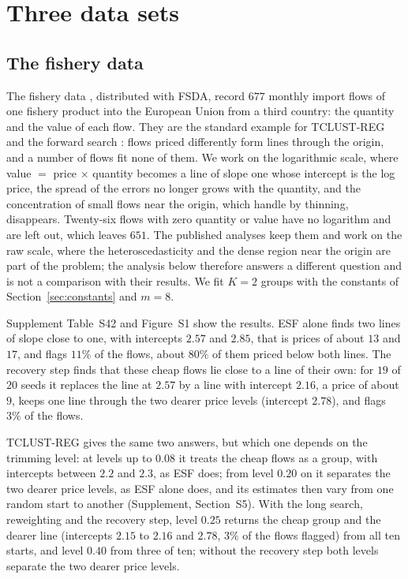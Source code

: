 \section{Three data sets}
\label{sec:realdata}

\subsection{The fishery data}
\label{sec:fishery}

The fishery data \citep{riani2008fitting}, distributed with FSDA, record $677$ monthly import
flows of one fishery product into the European Union from a third country: the quantity and
the value of each flow. They are the standard example for TCLUST-REG and the forward search
\citep{perrotta2009new,cerioli2014robust}: flows priced differently form lines through the
origin, and a number of flows fit none of them. We work on the logarithmic scale, where value
$=$ price $\times$ quantity becomes a line of slope one whose intercept is the log price, the
spread of the errors no longer grows with the quantity, and the concentration of small flows
near the origin, which \citet{cerioli2014robust} handle by thinning, disappears. Twenty-six
flows with zero quantity or value have no logarithm and are left out, which leaves $651$. The
published analyses \citep{perrotta2009new,cerioli2014robust,torti2019assessing} keep them and
work on the raw scale, where the heteroscedasticity and the dense region near the origin are
part of the problem; the analysis below therefore answers a different question and is not a
comparison with their results. We fit $K=2$ groups with the constants of Section~\ref{sec:constants} and
$m=8$.

Supplement Table~S42 and Figure~S1 show the results. ESF alone finds two lines
of slope close to one, with intercepts $2.57$ and $2.85$, that is prices of about $13$ and
$17$, and flags $11\%$ of the flows, about $80\%$ of them priced below both lines. The recovery
step finds that these cheap flows lie close to a line of their own: for $19$ of $20$ seeds it
replaces the line at $2.57$ by a line with intercept $2.16$, a price of about $9$, keeps one
line through the two dearer price levels (intercept $2.78$), and flags $3\%$ of the flows.

TCLUST-REG gives the same two answers, but which one depends on the trimming level: at levels
up to $0.08$ it treats the cheap flows as a group, with intercepts between $2.2$ and $2.3$, as
ESF does; from level $0.20$ on it separates the two dearer price levels, as ESF alone does,
and its estimates then vary from one random start to another (Supplement, Section~S5). With the long search, reweighting and the recovery step,
level $0.25$ returns the cheap group and the dearer line (intercepts $2.15$ to $2.16$ and
$2.78$, $3\%$ of the flows flagged) from all ten starts, and level $0.40$ from three of ten;
without the recovery step both levels separate the two dearer price levels.

